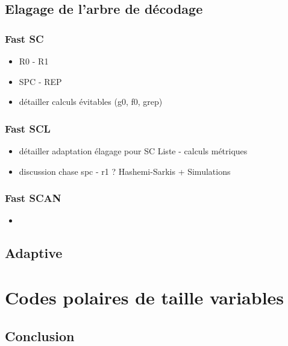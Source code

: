 \subsection{Elagage de l'arbre de décodage}

\subsubsection{Fast SC}
\begin{itemize}
\item R0 - R1
\item SPC - REP
\item détailler calculs évitables (g0, f0, grep)
\end{itemize}
\subsubsection{Fast SCL}
\begin{itemize}
\item détailler adaptation élagage pour SC Liste - calculs métriques
\item discussion chase spc - r1 ? Hashemi-Sarkis + Simulations
\end{itemize}
\subsubsection{Fast SCAN}
\begin{itemize}
\item 
\end{itemize}

\subsection{Adaptive}

\section{Codes polaires de taille variables}


\subsection*{Conclusion}
